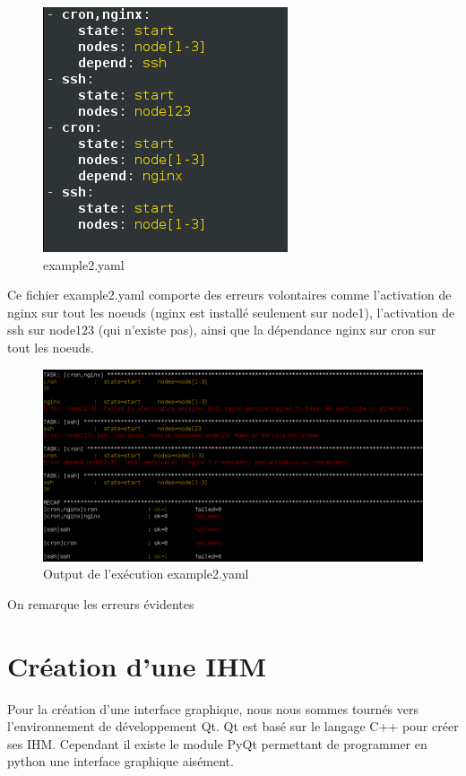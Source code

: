 \documentclass[a4paper,11pt]{article}
\begin{document}
\begin{figure}[H]
		\centerline{\includegraphics[scale=0.6]{example2_yaml.png}}
		\caption{example2.yaml}
\end{figure}
\noindent
Ce fichier example2.yaml comporte des erreurs volontaires comme l'activation de nginx sur tout les noeuds (nginx est installé seulement sur node1), l'activation de ssh sur node123 (qui n'existe pas), ainsi que la dépendance nginx sur cron sur tout les noeuds.

\begin{figure}[H]
		\centerline{\includegraphics[scale=0.4]{resultat2_yaml.png}}
		\caption{Output de l'exécution example2.yaml}
\end{figure}

On remarque les erreurs évidentes

\pagebreak

\section{Création d'une IHM}
\label{sec:section5}
Pour la création d'une interface graphique, nous nous sommes tournés vers l'environnement de développement Qt. Qt est basé sur le langage C++ pour créer ses IHM. Cependant il existe le module PyQt permettant de programmer en python une interface graphique aisément.
\end{document}
